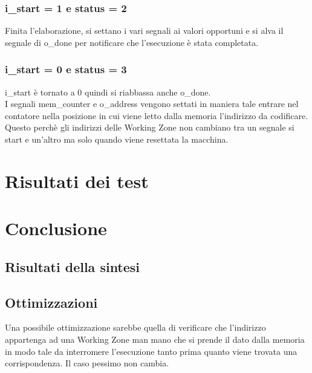 \documentclass{article}
\begin{document}
\subsubsection{{\selectfont i\_start} = 1 e {\selectfont status} = 2}
Finita l'elaborazione, si settano i vari segnali ai valori opportuni e si alva il segnale di {\selectfont o\_done} per notificare che l'esecuzione è stata completata.
\subsubsection{{\selectfont i\_start} = 0 e {\selectfont status} = 3}
{\selectfont i\_start} è tornato a 0 quindi si riabbassa anche {\selectfont o\_done}.\\
I segnali {\selectfont mem\_counter} e {\selectfont o\_address} vengono settati in maniera tale entrare nel contatore nella posizione in cui viene letto dalla memoria l'indirizzo da codificare. Questo perchè gli indirizzi delle Working Zone non cambiano tra un segnale si start e un'altro ma solo quando viene resettata la macchina.
\pagebreak
\section{Risultati dei test}
\section{Conclusione}
\subsection{Risultati della sintesi}
\subsection{Ottimizzazioni}
Una possibile ottimizzazione sarebbe quella di verificare che l'indirizzo appartenga ad una Working Zone man mano che si prende il dato dalla memoria in modo tale da interromere l'esecuzione tanto prima quanto viene trovata una corrispondenza. Il caso pessimo non cambia.
\end{document}
